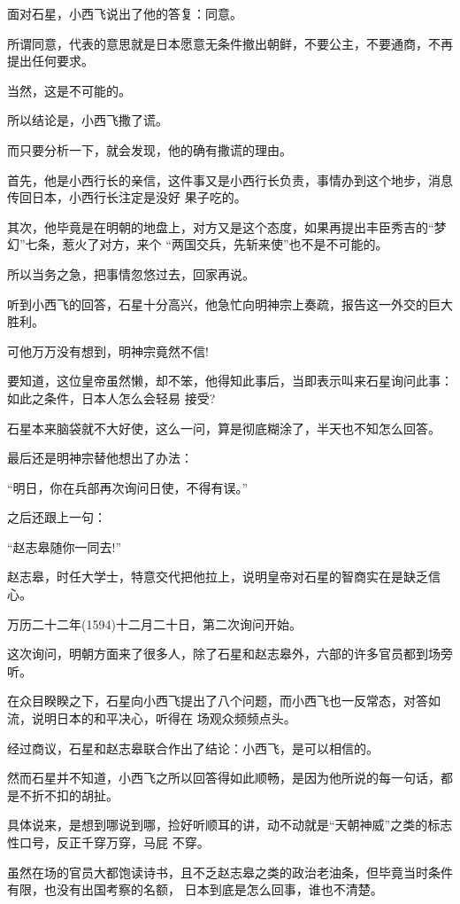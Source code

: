 \documentclass[11pt,a4paper,onecolumn]{article}
\begin{document}
面对石星，小西飞说出了他的答复：同意。

所谓同意，代表的意思就是日本愿意无条件撤出朝鲜，不要公主，不要通商，不再提出任何要求。

当然，这是不可能的。

所以结论是，小西飞撒了谎。

而只要分析一下，就会发现，他的确有撒谎的理由。

首先，他是小西行长的亲信，这件事又是小西行长负责，事情办到这个地步，消息传回日本，小西行长注定是没好
果子吃的。

其次，他毕竟是在明朝的地盘上，对方又是这个态度，如果再提出丰臣秀吉的``梦幻''七条，惹火了对方，来个
``两国交兵，先斩来使''也不是不可能的。

所以当务之急，把事情忽悠过去，回家再说。

听到小西飞的回答，石星十分高兴，他急忙向明神宗上奏疏，报告这一外交的巨大胜利。

可他万万没有想到，明神宗竟然不信!

要知道，这位皇帝虽然懒，却不笨，他得知此事后，当即表示叫来石星询问此事：如此之条件，日本人怎么会轻易
接受?

石星本来脑袋就不大好使，这么一问，算是彻底糊涂了，半天也不知怎么回答。

最后还是明神宗替他想出了办法：

``明日，你在兵部再次询问日使，不得有误。''

之后还跟上一句：

``赵志皋随你一同去!''

赵志皋，时任大学士，特意交代把他拉上，说明皇帝对石星的智商实在是缺乏信心。

万历二十二年(1594)十二月二十日，第二次询问开始。

这次询问，明朝方面来了很多人，除了石星和赵志皋外，六部的许多官员都到场旁听。

在众目睽睽之下，石星向小西飞提出了八个问题，而小西飞也一反常态，对答如流，说明日本的和平决心，听得在
场观众频频点头。

经过商议，石星和赵志皋联合作出了结论：小西飞，是可以相信的。

然而石星并不知道，小西飞之所以回答得如此顺畅，是因为他所说的每一句话，都是不折不扣的胡扯。

具体说来，是想到哪说到哪，捡好听顺耳的讲，动不动就是``天朝神威''之类的标志性口号，反正千穿万穿，马屁
不穿。

虽然在场的官员大都饱读诗书，且不乏赵志皋之类的政治老油条，但毕竟当时条件有限，也没有出国考察的名额，
日本到底是怎么回事，谁也不清楚。
\end{document}
